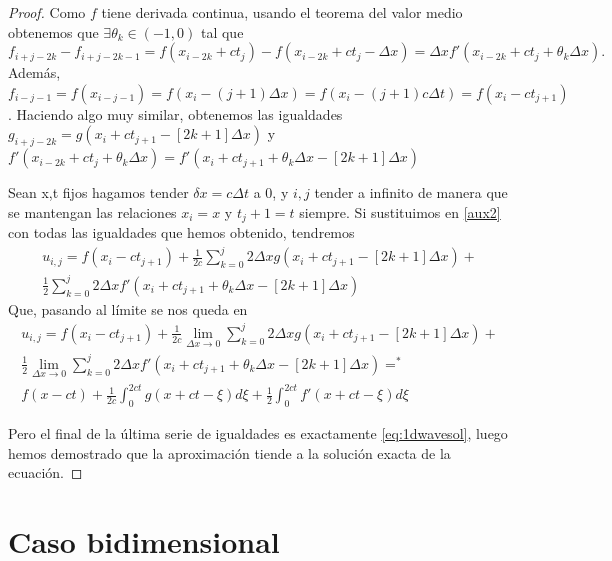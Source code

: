 \begin{proof}
	Como $f$ tiene derivada continua, usando el teorema del valor medio obtenemos que $\exists\theta_k\in(-1,0)$ tal que
	\begin{equation*}
		f_{i+j-2k}-f_{i+j-2k-1} = f(x_{i-2k}+ct_j) - f(x_{i-2k}+ct_{j}-\Delta x) = \Delta xf'(x_{i-2k}+ct_j+\theta_k\Delta x).
	\end{equation*} 
	Además, $f_{i-j-1}=f(x_{i-j-1})=f(x_i-(j+1)\Delta x)=f(x_i -(j+1)c\Delta t)=f(x_i-ct_{j+1})$. Haciendo algo muy similar, obtenemos las igualdades $g_{i+j-2k}=g(x_i+ct_{j+1}-[2k+1]\Delta x)$ y $f'(x_{i-2k}+ct_j+\theta_k\Delta x)=f'(x_i+ct_{j+1}+\theta_k\Delta x - [2k+1]\Delta x)$
	
	Sean x,t fijos hagamos tender $\delta x=c\Delta t$ a 0, y $i,j$ tender a infinito de manera que se mantengan las relaciones $x_i=x$ y $t_j+1=t$ siempre.
	Si sustituimos en \ref{aux2} con todas las igualdades que hemos obtenido, tendremos
	\begin{equation*}
	\begin{split}
		u_{i,j} = f(x_i-ct_{j+1}) + \frac{1}{2c}\sum_{k=0}^{j}2\Delta xg(x_i+ct_{j+1}-[2k+1]\Delta x) + \\ \frac{1}{2}\sum_{k=0}^{j}2\Delta xf'(x_i+ct_{j+1} +\theta_k\Delta x - [2k+1]\Delta x)
	\end{split}
	\end{equation*}
	Que, pasando al límite se nos queda en
	\begin{equation*}
	\begin{split}
		u_{i,j} = f(x_i-ct_{j+1}) + \frac{1}{2c}\lim_{\Delta x\rightarrow0}\sum_{k=0}^{j}2\Delta xg(x_i+ct_{j+1}-[2k+1]\Delta x) + \\ \frac{1}{2}\lim_{\Delta x\rightarrow0}\sum_{k=0}^{j}2\Delta xf'(x_i+ct_{j+1} +\theta_k\Delta x - [2k+1]\Delta x) =^{*} \\
		f(x-ct) + \frac{1}{2c}\int_{0}^{2ct}g(x+ct-\xi)d\xi + \frac{1}{2}\int_{0}^{2ct}f'(x+ct-\xi)d\xi
	\end{split}
	\end{equation*}
	
	Pero el final de la última serie de igualdades es exactamente \ref{eq:1dwavesol}, luego hemos demostrado que la aproximación tiende a la solución exacta de la ecuación.
\end{proof}

\section{Caso bidimensional}


